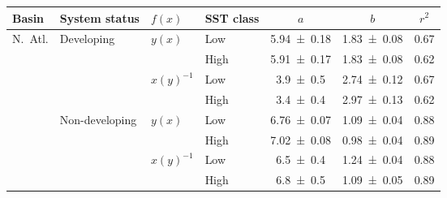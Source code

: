 \begin{table}[H]
	\centering
	\begin{tabular}{l l l l c c c }
		\toprule
		\toprule
		Basin & System status & $f(x)$ & SST class & $a$ & $b$ & $r^{2}$ \\
		\midrule
		\multirow{8}{*}{N.~Atl.}
		& \multirow{4}{*}{Developing}
		& \multirow{2}{*}{$y(x)$}
		  & Low  & \num{5.94 \pm 0.18} & \num{1.83 \pm 0.08} & \num{0.67} \\
		& & & High & \num{5.91 \pm 0.17} & \num{1.83 \pm 0.08} & \num{0.62} \\
		\cmidrule(l){3-7}
		& & \multirow{2}{*}{$x(y)^{-1}$}
		  & Low  & \num{3.9 \pm 0.5} & \num{2.74 \pm 0.12} & \num{0.67} \\
		& & & High & \num{3.4 \pm 0.4} & \num{2.97 \pm 0.13} & \num{0.62} \\
		\cmidrule(l){2-7} %
		& \multirow{4}{*}{Non-developing}
		& \multirow{2}{*}{$y(x)$}
		  & Low  & \num{6.76 \pm 0.07} & \num{1.09 \pm 0.04} & \num{0.88} \\
		& & & High & \num{7.02 \pm 0.08} & \num{0.98 \pm 0.04} & \num{0.89} \\
		\cmidrule(l){3-7}
		& & \multirow{2}{*}{$x(y)^{-1}$}
		  & Low  & \num{6.5 \pm 0.4} & \num{1.24 \pm 0.04} & \num{0.88} \\
		& & & High & \num{6.8 \pm 0.5} & \num{1.09 \pm 0.05} & \num{0.89} \\


\end{tabular}
\end{table}
